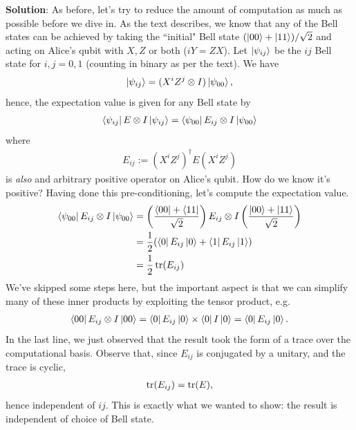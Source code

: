 \documentclass{book}
\begin{document}
    \textbf{Solution}: As before, let's try to reduce the amount of computation as much as possible before we dive in. As the text describes, we know that any of the Bell states can be achieved by taking the ``initial" Bell state $(\ket{00}+\ket{11})/\sqrt{2}$ and acting on Alice's qubit with $X, Z$ or both ($iY = ZX$). Let $\ket{\psi_{ij}}$ be the $ij$ Bell state for $i, j = 0,1$ (counting in binary as per the text). We have
    \begin{align}
        \ket{\psi_{ij}} = (X^i Z^j \otimes I) \ket{\psi_{00}},
    \end{align}
    hence, the expectation value is given for any Bell state by
    \begin{align}
        \bra{\psi_{ij}} E\otimes  I \ket{\psi_{ij}} = \bra{\psi_{00}} E_{ij} \otimes I \ket{\psi_{00}}
    \end{align}
    where
    \begin{align}
        E_{ij} := (X^i Z^j)^\dagger E (X^i Z^j)
    \end{align}
    is \emph{also} and arbitrary positive operator on Alice's qubit. How do we know it's positive? Having done this pre-conditioning, let's compute the expectation value.
    \begin{align}
    \begin{aligned}
        \bra{\psi_{00}} E_{ij}\otimes I \ket{\psi_{00}} &= \left(\frac{\bra{00}+\bra{11}}{\sqrt{2}}\right) E_{ij} \otimes I\left(\frac{\ket{00} + \ket{11}}{\sqrt{2}}\right) \\
        &=\frac{1}{2} (\bra{0}E_{ij} \ket{0} + \bra{1}E_{ij} \ket{1}) \\
        &= \frac{1}{2} \tr(E_{ij})
    \end{aligned}
    \end{align}
    We've skipped some steps here, but the important aspect is that we can simplify many of these inner products by exploiting the tensor product, e.g.
    \begin{align}  
        \bra{00}E_{ij} \otimes I \ket{00} = \bra{0}E_{ij}\ket{0} \times \bra{0} I \ket{0} = \bra{0}E_{ij}\ket{0}.
    \end{align}
    In the last line, we just observed that the result took the form of a trace over the computational basis. Observe that, since $E_{ij}$ is conjugated by a unitary, and the trace is cyclic,
    \begin{align}
        \tr (E_{ij}) = \tr (E),
    \end{align}
    hence independent of $ij$. This is exactly what we wanted to show: the result is independent of choice of Bell state.
\end{document}
